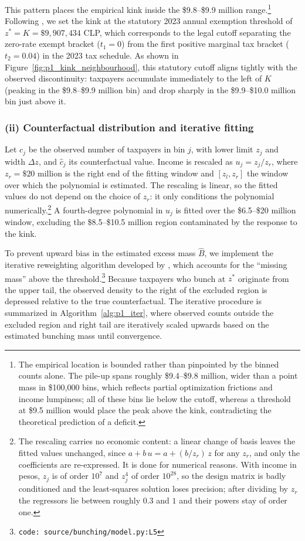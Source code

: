 This pattern places the empirical kink inside the \$9.8--\$9.9 million range.\footnote{The empirical location is bounded rather than pinpointed by the binned counts alone. The pile-up spans roughly \$9.4--\$9.8 million, wider than a point mass in \$100,000 bins, which reflects partial optimization frictions and income lumpiness; all of these bins lie below the cutoff, whereas a threshold at \$9.5 million would place the peak above the kink, contradicting the theoretical prediction of a deficit.} Following \cite{gutierrezNoExemption}, we set the kink at the statutory 2023 annual exemption threshold of $z^* = K = \$9{,}907{,}434$ CLP, which corresponds to the legal cutoff separating the zero-rate exempt bracket ($t_1 = 0$) from the first positive marginal tax bracket ($t_2 = 0.04$) in the 2023 tax schedule. As shown in Figure~\ref{fig:p1_kink_neighbourhood}, this statutory cutoff aligns tightly with the observed discontinuity: taxpayers accumulate immediately to the left of $K$ (peaking in the \$9.8--\$9.9 million bin) and drop sharply in the \$9.9--\$10.0 million bin just above it.


\subsubsection*{(ii) Counterfactual distribution and iterative fitting}

Let $c_j$ be the observed number of taxpayers in bin $j$, with lower limit $z_j$ and width $\Delta z$, and $\hat{c}_j$ its counterfactual value. Income is rescaled as $u_j = z_j/z_r$, where $z_r = \$20$ million is the right end of the fitting window and $[z_l, z_r]$ the window over which the polynomial is estimated. The rescaling is linear, so the fitted values do not depend on the choice of $z_r$: it only conditions the polynomial numerically.\footnote{The rescaling carries no economic content: a linear change of basis leaves the fitted values unchanged, since $a + b\,u = a + (b/z_r)\,z$ for any $z_r$, and only the coefficients are re-expressed. It is done for numerical reasons. With income in pesos, $z_j$ is of order $10^{7}$ and $z_j^{4}$ of order $10^{28}$, so the design matrix is badly conditioned and the least-squares solution loses precision; after dividing by $z_r$ the regressors lie between roughly $0.3$ and $1$ and their powers stay of order one.} A fourth-degree polynomial in $u_j$ is fitted over the \$6.5--\$20 million window, excluding the \$8.5--\$10.5 million region contaminated by the response to the kink. 

To prevent upward bias in the estimated excess mass $\hat{B}$, we implement the iterative reweighting algorithm developed by \cite{chetty2011salience}, which accounts for the ``missing mass'' above the threshold.\footnote{\texttt{code: source/bunching/model.py:L5}} Because taxpayers who bunch at $z^*$ originate from the upper tail, the observed density to the right of the excluded region is depressed relative to the true counterfactual. The iterative procedure is summarized in Algorithm~\ref{alg:p1_iter}, where observed counts outside the excluded region and right tail are iteratively scaled upwards based on the estimated bunching mass until convergence.

